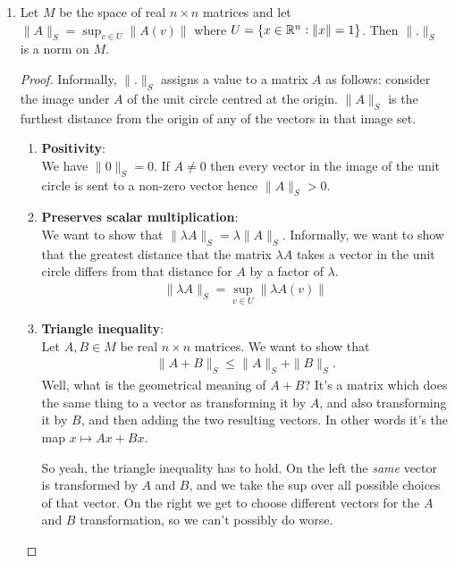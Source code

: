 \documentclass[12pt]{article}
\begin{document}
\begin{enumerate}[label=(\roman*)]
\item
  \begin{claim*}
    Let $M$ be the space of real $n \times n$ matrices and let $\|A\|_S = \sup_{v \in U} \|A(v)\|$
    where $U = \{x \in \mathbb{R}^n : \|x\| = 1\}$. Then $\|.\|_S$ is a norm on $M$.
  \end{claim*}
  \begin{proof}
    Informally, $\|.\|_S$ assigns a value to a matrix $A$ as follows: consider the image under $A$ of
    the unit circle centred at the origin. $\|A\|_S$ is the furthest distance from the origin of any
    of the vectors in that image set.
    \begin{enumerate}
    \item {\bf Positivity}:\\
      We have $\|0\|_S = 0$. If $A \neq 0$ then every vector in the image of the unit circle is
      sent to a non-zero vector hence $\|A\|_S > 0$.
    \item {\bf Preserves scalar multiplication}:\\
      We want to show that $\|\lambda A\|_S = \lambda \|A\|_S$. Informally, we want to show that the
      greatest distance that the matrix $\lambda A$ takes a vector in the unit circle differs from
      that distance for $A$ by a factor of $\lambda$.
      \begin{align*}
        \|\lambda A\|_S = \sup_{v \in U} \|\lambda A(v)\|
      \end{align*}
        \todo{}
      \item {\bf Triangle inequality}:\\
        Let $A, B \in M$ be real $n \times n$ matrices. We want to show that
      \begin{align*}
        \|A + B\|_S \leq \|A\|_S + \|B\|_S.
      \end{align*}
      Well, what is the geometrical meaning of $A + B$? It's a matrix which does the same thing to
      a vector as transforming it by $A$, and also transforming it by $B$, and then adding the two
      resulting vectors. In other words it's the map $x \mapsto Ax + Bx$.

      So yeah, the triangle inequality has to hold. On the left the {\it same} vector is
      transformed by $A$ and $B$, and we take the sup over all possible choices of that vector. On
      the right we get to choose different vectors for the $A$ and $B$ transformation, so we can't
      possibly do worse.


\end{enumerate}
\end{proof}
\end{enumerate}
\end{document}
